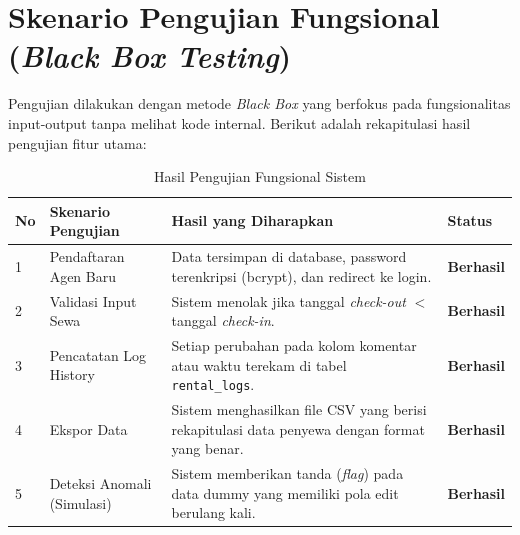 \section{Skenario Pengujian Fungsional (\textit{Black Box Testing})}
Pengujian dilakukan dengan metode \textit{Black Box} yang berfokus pada fungsionalitas input-output tanpa melihat kode internal. Berikut adalah rekapitulasi hasil pengujian fitur utama:

\begin{table}[H]
\centering
\caption{Hasil Pengujian Fungsional Sistem}
\label{tab:functional_test}
\begin{tabular}{|p{0.5cm}|p{4cm}|p{5cm}|p{2.5cm}|}
    \hline
    \textbf{No} & \textbf{Skenario Pengujian} & \textbf{Hasil yang Diharapkan} & \textbf{Status} \\ \hline
    1 & Pendaftaran Agen Baru & Data tersimpan di database, password terenkripsi (bcrypt), dan redirect ke login. & \textbf{Berhasil} \\ \hline
    2 & Validasi Input Sewa & Sistem menolak jika tanggal \textit{check-out} $<$ tanggal \textit{check-in}. & \textbf{Berhasil} \\ \hline
    3 & Pencatatan Log History & Setiap perubahan pada kolom komentar atau waktu terekam di tabel \texttt{rental\_logs}. & \textbf{Berhasil} \\ \hline
    4 & Ekspor Data & Sistem menghasilkan file CSV yang berisi rekapitulasi data penyewa dengan format yang benar. & \textbf{Berhasil} \\ \hline
    5 & Deteksi Anomali (Simulasi) & Sistem memberikan tanda (\textit{flag}) pada data dummy yang memiliki pola edit berulang kali. & \textbf{Berhasil} \\ \hline
    \end{tabular}
\end{table}